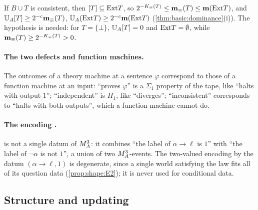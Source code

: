 \begin{remark}\label{rem:setting:complexities}
If $B\cup T$ is consistent, then $[T]\subseteq\mathrm{Ext} T$, so $2^{-K_{\equiv}(T)}\le\mathbf{m}_{\equiv}(T)\le\mathbf{m}(\mathrm{Ext} T)$, and $\mathbb{U}_{A}[T]\ge2^{-c}\mathbf{m}_{\equiv}(T)$, $\mathbb{U}_{A}(\mathrm{Ext} T)\ge2^{-c}\mathbf{m}(\mathrm{Ext} T)$ (\cref{thm:basic:dominance}(i)). The hypothesis is needed: for $T=\{\bot\}$, $\mathbb{U}_{A}[T]=0$ and $\mathrm{Ext} T=\emptyset$, while $\mathbf{m}_{\equiv}(T)\ge2^{-K_{\equiv}(T)}>0$.
\end{remark}

\paragraph{The two defects and function machines.}\label{par:setting:defects} The outcomes of a theory machine at a sentence $\varphi$ correspond to those of a function machine at an input: ``proves $\varphi$'' is a $\Sigma_1$ property of the tape, like ``halts with output $1$''; ``independent'' is $\Pi_1$, like ``diverges''; ``inconsistent'' corresponds to ``halts with both outputs'', which a function machine cannot do.

\paragraph{The encoding \Ethree.}\label{par:setting:E3} \Ethree{} is not a single datum of $M_{A}^{3}$: it combines ``the label of $\alpha\to\ell$ is $1$'' with ``the label of $\neg\alpha$ is not $1$'', a union of two $M_{A}^{3}$-events. The two-valued encoding by the datum $(\alpha\to\ell,1)$ is degenerate, since a single world satisfying the law fits all of its question data (\cref{prop:shape:E2}); it is never used for conditional data.

\subsection{Structure and updating}\label{app:basic:structure}

